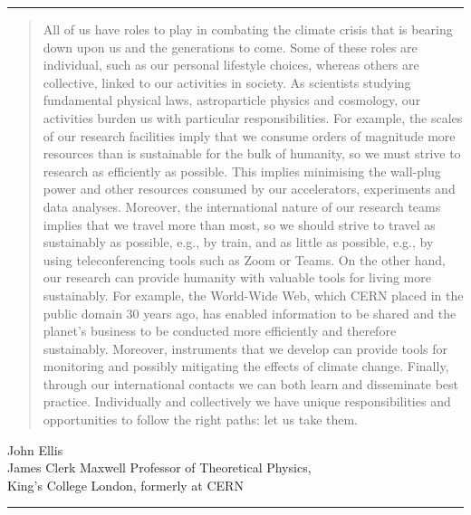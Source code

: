 \documentclass[../SustainableHEP.tex]{subfiles}
\begin{document}
\textcolor{Pythongreen}{\rule{2cm}{3pt}}

\begin{quotation}
All of us have roles to play in combating the climate crisis that is bearing down upon us and the generations to come. Some of these roles are individual, such as our personal lifestyle choices, whereas others are collective, linked to our activities in society. As scientists studying fundamental physical laws, astroparticle physics and cosmology, our activities burden us with particular responsibilities. For example, the scales of our research facilities imply that we consume orders of magnitude more resources than is sustainable for the bulk of humanity, so we must strive to research as efficiently as possible. This implies minimising the wall-plug power and other resources consumed by our accelerators, experiments and data analyses. Moreover, the international nature of our research teams implies that we travel more than most, so we should strive to travel as sustainably as possible, e.g., by train, and as little as possible, e.g., by using teleconferencing tools such as Zoom or Teams. On the other hand, our research can provide humanity with valuable tools for living more sustainably. For example, the World-Wide Web, which CERN placed in the public domain 30 years ago, has enabled information to be shared and the planet’s business to be conducted more efficiently and therefore sustainably. Moreover, instruments that we develop can provide tools for monitoring and possibly mitigating the effects of climate change. Finally, through our international contacts we can both learn and disseminate best practice. Individually and collectively we have unique responsibilities and opportunities to follow the right paths: let us take them.
\end{quotation}
\begin{flushleft}
John Ellis\\
James Clerk Maxwell Professor of Theoretical Physics,\\
King’s College London, formerly at CERN
\end{flushleft}

\textcolor{Pythongreen}{\rule{2cm}{3pt}}
\end{document}
